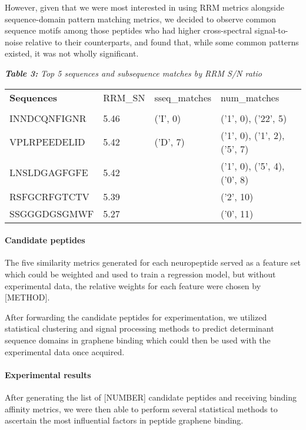 \documentclass[]{article}
\let\oldparagraph\paragraph
\renewcommand{\paragraph}[1]{\oldparagraph{#1}\mbox{}}
\begin{document}
However, given that we were most interested in using RRM metrics alongside sequence-domain pattern matching metrics, we decided to observe common sequence motifs among those peptides who had higher cross-spectral signal-to-noise relative to their counterparts, and found that, while some common patterns existed, it was not wholly significant.

\textbf{\emph{Table 3:}} \emph{Top 5 sequences and subsequence matches by RRM S/N ratio}
\begin{longtable}[]{llll}
\toprule
\textbf{Sequences} & RRM\_SN  & sseq\_matches & num\_matches \\ \tabularnewline
\midrule
\endhead
INNDCQNFIGNR  & 5.46   & ('I', 0)      &  ('1', 0), ('22', 5) \\
VPLRPEEDELID  & 5.42    & ('D', 7)      &  ('1', 0), ('1', 2), ('5', 7) \\
LNSLDGAGFGFE & 5.42     &              & ('1', 0), ('5', 4), ('0', 8)           \\
RSFGCRFGTCTV & 5.39    &               & ('2', 10)             \\
SSGGGDGSGMWF & 5.27   &                     & ('0', 11)                       
\end{longtable}



\hypertarget{candidate-peptides}{%
\paragraph{Candidate peptides}\label{candidate-peptides}}

The five similarity metrics generated for each neuropeptide served as a feature set which could be weighted and used to train a regression model, but without experimental data, the relative weights for each feature were chosen by {[}METHOD{]}.

After forwarding the candidate peptides for experimentation, we utilized statistical clustering and signal processing methods to predict determinant sequence domains in graphene binding which could then be used with the experimental data once acquired.

\hypertarget{experimental-results}{%
\paragraph{Experimental results}\label{experimental-results}}

After generating the list of {[}NUMBER{]} candidate peptides and receiving binding affinity metrics, we were then able to perform several statistical methods to ascertain the most influential factors in peptide graphene binding.
\end{document}
